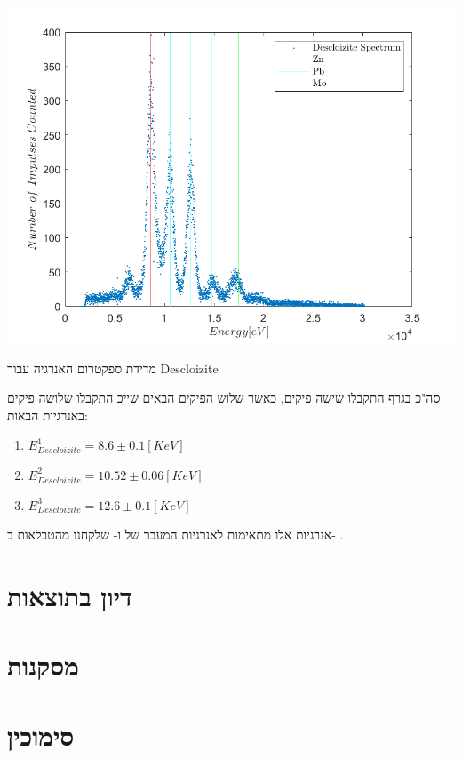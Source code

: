\documentclass{article}
\begin{document}
\begin{graph}[H]
    \centering
    \includegraphics[width=\textwidth]{Descloizit.png}
    \caption{
    מדידת ספקטרום האנרגיה עבור 
    \textenglish{Descloizite}
    }
    \label{graph:Descloizit-spec}
\end{graph}

סה"כ בגרף התקבלו שישה פיקים, כאשר שלוש הפיקים הבאים שייכ
התקבלו שלושה פיקים באנרגיות הבאות:

\begin{enumerate}
    \item $E_{Descloizite}^1 = 8.6 \pm 0.1 [KeV]$
    \item $E_{Descloizite}^2 = 10.52 \pm 0.06 [KeV]$
    \item $E_{Descloizite}^3 = 12.6 \pm 0.1 [KeV]$
\end{enumerate}

אנרגיות אלו מתאימות לאנרגיות המעבר של
ו-
שלקחנו מהטבלאות ב-
\cite{xrayBooklet}.


\section{דיון בתוצאות}

\section{מסקנות}

\section*{סימוכין}
\begin{english}
\printbibliography[heading=none]{}
\end{english}
\end{document}
